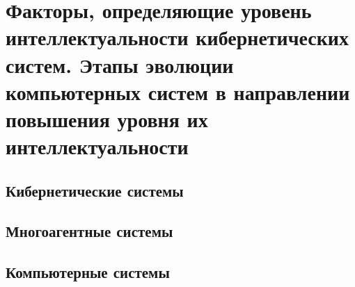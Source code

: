 \chapter{Факторы, определяющие уровень интеллектуальности кибернетических систем. Этапы эволюции компьютерных систем в направлении повышения уровня их интеллектуальности}
\label{chapter_intro}


\section{Кибернетические системы}
\section{Многоагентные системы}
\section{Компьютерные системы}

%